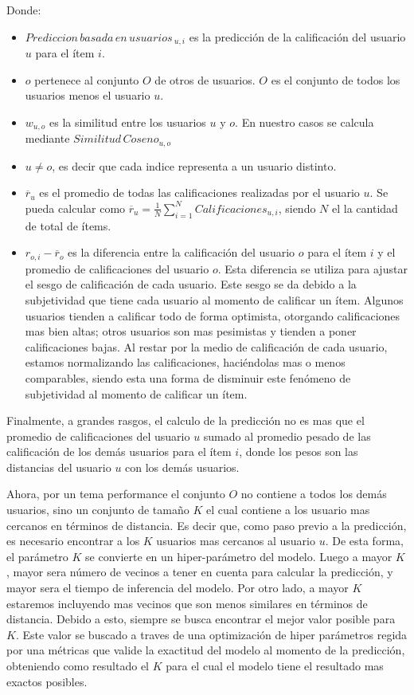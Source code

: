 \documentclass[11pt,a4paper,twoside]{thesis}
\begin{document}
\begin{description}
	\item[Donde:]
\end{description}
\begin{itemize}
	\item $Prediccion \mspace{3mu}basada \mspace{3mu}en \mspace{3mu}usuarios\mspace{3mu}_{u, i}$ es la predicción de la calificación del usuario $u$ para el ítem $i$.
	\item $o$ pertenece al conjunto $O$ de otros de usuarios. $O$ es el conjunto de todos los usuarios menos el usuario $u$.
	\item $w_{u,o}$ es la similitud entre los usuarios $u$ y $o$. En nuestro casos se calcula mediante $Similitud \mspace{3mu}Coseno_{u, o}$
	\item $u \neq o$, es decir que cada indice representa a un usuario distinto.
	\item $\overline{r}_{u}$ es el promedio de todas las calificaciones realizadas por el usuario $u$. Se pueda calcular como $\overline{r}_{u} = \frac{1}{N} \sum_{i=1}^N Calificaciones_{u,i}$, siendo $N$ el la cantidad de total de ítems.
	\item $r_{o,i} - \overline{r}_{o}$ es la diferencia entre la calificación del usuario $o$ para el ítem $i$ y el promedio de calificaciones del usuario $o$. Esta diferencia se utiliza para ajustar el sesgo de calificación de cada usuario. Este sesgo se da debido a la subjetividad que tiene cada usuario al momento de calificar un ítem. Algunos usuarios tienden a calificar todo de forma optimista, otorgando calificaciones mas bien altas; otros usuarios son mas pesimistas y tienden a poner calificaciones bajas. Al restar por la medio de calificación de cada usuario, estamos normalizando las calificaciones, haciéndolas mas o menos comparables, siendo esta una forma de disminuir este fenómeno de subjetividad al momento de calificar un ítem.
\end{itemize}

Finalmente, a grandes rasgos, el calculo de la predicción no es mas que el
promedio de calificaciones del usuario $u$ sumado al promedio pesado de las
calificación de los demás usuarios para el ítem $i$, donde los pesos son las
distancias del usuario $u$ con los demás usuarios.

Ahora, por un tema performance el conjunto $O$ no contiene a todos los demás
usuarios, sino un conjunto de tamaño $K$ el cual contiene a los usuario mas
cercanos en términos de distancia. Es decir que, como paso previo a la
predicción, es necesario encontrar a los $K$ usuarios mas cercanos al usuario
$u$. De esta forma, el parámetro $K$ se convierte en un hiper-parámetro del
modelo. Luego a mayor $K$, mayor sera número de vecinos a tener en cuenta para
calcular la predicción, y mayor sera el tiempo de inferencia del modelo. Por
otro lado, a mayor $K$ estaremos incluyendo mas vecinos que son menos similares
en términos de distancia. Debido a esto, siempre se busca encontrar el mejor
valor posible para $K$. Este valor se buscado a traves de una optimización de
hiper parámetros regida por una métricas que valide la exactitud del modelo al
momento de la predicción, obteniendo como resultado el $K$ para el cual el
modelo tiene el resultado mas exactos posibles.
\end{document}
